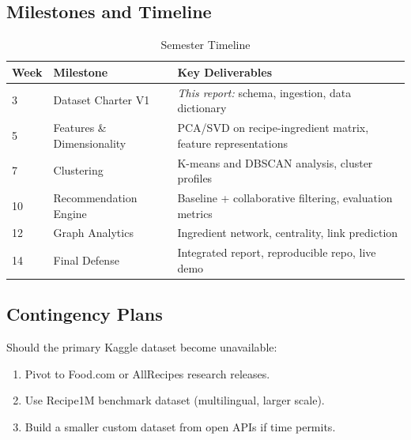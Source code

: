 \documentclass[11pt,a4paper]{article}
\begin{document}
\subsection{Milestones and Timeline}

\begin{table}[H]
    \centering
    \begin{tabular}{|p{1.5cm}|p{3cm}|p{7.5cm}|}
        \hline
        \textbf{Week} & \textbf{Milestone} & \textbf{Key Deliverables} \\
        \hline
        3 & Dataset Charter V1 & \textit{This report:} schema, ingestion, data dictionary \\
        \hline
        5 & Features \& Dimensionality & PCA/SVD on recipe-ingredient matrix, feature representations \\
        \hline
        7 & Clustering & K-means and DBSCAN analysis, cluster profiles \\
        \hline
        10 & Recommendation Engine & Baseline + collaborative filtering, evaluation metrics \\
        \hline
        12 & Graph Analytics & Ingredient network, centrality, link prediction \\
        \hline
        14 & Final Defense & Integrated report, reproducible repo, live demo \\
        \hline
    \end{tabular}
    \caption{Semester Timeline}
    \label{tab:timeline}
\end{table}

\subsection{Contingency Plans}

Should the primary Kaggle dataset become unavailable:

\begin{enumerate}
    \item Pivot to Food.com or AllRecipes research releases.
    \item Use Recipe1M benchmark dataset (multilingual, larger scale).
    \item Build a smaller custom dataset from open APIs if time permits.
\end{enumerate}

\newpage

\end{document}
